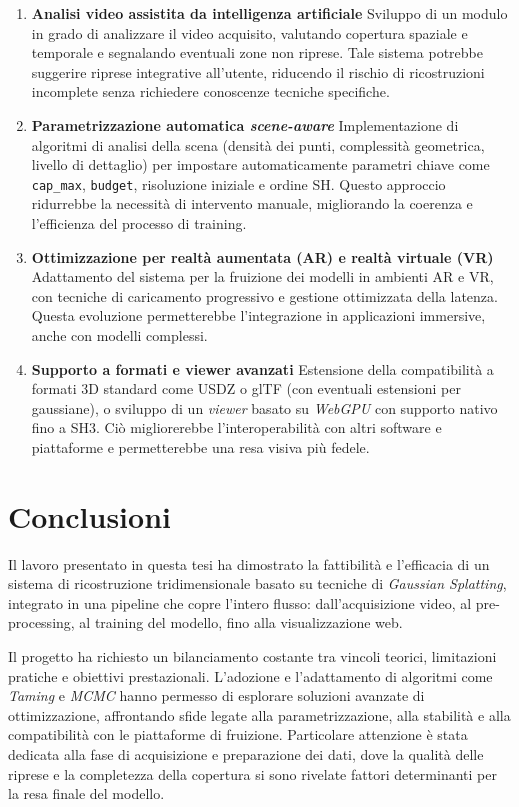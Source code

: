 \begin{enumerate}
	
	\item \textbf{Analisi video assistita da intelligenza artificiale}  
	Sviluppo di un modulo in grado di analizzare il video acquisito, valutando copertura spaziale e temporale e segnalando eventuali zone non riprese.  
	Tale sistema potrebbe suggerire riprese integrative all'utente, riducendo il rischio di ricostruzioni incomplete senza richiedere conoscenze tecniche specifiche.
	
	\item \textbf{Parametrizzazione automatica \emph{scene-aware}}  
	Implementazione di algoritmi di analisi della scena (densità dei punti, complessità geometrica, livello di dettaglio) per impostare automaticamente parametri chiave come \texttt{cap\_max}, \texttt{budget}, risoluzione iniziale e ordine SH.  
	Questo approccio ridurrebbe la necessità di intervento manuale, migliorando la coerenza e l'efficienza del processo di training.
	
	\item \textbf{Ottimizzazione per realtà aumentata (AR) e realtà virtuale (VR)}  
	Adattamento del sistema per la fruizione dei modelli in ambienti AR e VR, con tecniche di caricamento progressivo e gestione ottimizzata della latenza.  
	Questa evoluzione permetterebbe l'integrazione in applicazioni immersive, anche con modelli complessi.
	
	\item \textbf{Supporto a formati e viewer avanzati}  
	Estensione della compatibilità a formati 3D standard come USDZ o glTF (con eventuali estensioni per gaussiane), o sviluppo di un \emph{viewer} basato su \emph{WebGPU} con supporto nativo fino a SH3.  
	Ciò migliorerebbe l'interoperabilità con altri software e piattaforme e permetterebbe una resa visiva più fedele.
\end{enumerate}

\section{Conclusioni}
Il lavoro presentato in questa tesi ha dimostrato la fattibilità e l'efficacia di un sistema di ricostruzione tridimensionale basato su tecniche di \emph{Gaussian Splatting}, integrato in una pipeline che copre l'intero flusso: dall'acquisizione video, al pre-processing, al training del modello, fino alla visualizzazione web.  

Il progetto ha richiesto un bilanciamento costante tra vincoli teorici, limitazioni pratiche e obiettivi prestazionali.  
L'adozione e l'adattamento di algoritmi come \emph{Taming} e \emph{MCMC} hanno permesso di esplorare soluzioni avanzate di ottimizzazione, affrontando sfide legate alla parametrizzazione, alla stabilità e alla compatibilità con le piattaforme di fruizione.  
Particolare attenzione è stata dedicata alla fase di acquisizione e preparazione dei dati, dove la qualità delle riprese e la completezza della copertura si sono rivelate fattori determinanti per la resa finale del modello.


